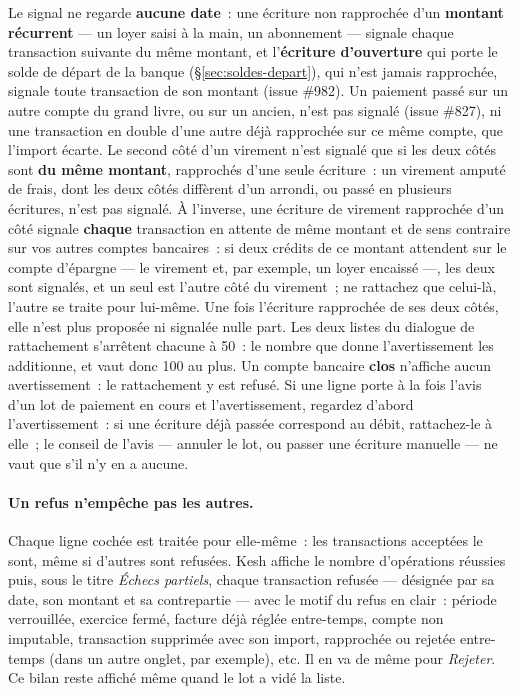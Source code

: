 \documentclass[a4paper,11pt,oneside]{article}
\begin{document}
Le signal ne regarde \textbf{aucune date}~: une écriture non rapprochée d'un \textbf{montant récurrent} --- un loyer saisi à la main, un abonnement --- signale chaque transaction suivante du même montant, et l'\textbf{écriture d'ouverture} qui porte le solde de départ de la banque (\S\ref{sec:soldes-depart}), qui n'est jamais rapprochée, signale toute transaction de son montant (issue \#982). Un paiement passé sur un autre compte du grand livre, ou sur un ancien, n'est pas signalé (issue \#827), ni une transaction en double d'une autre déjà rapprochée sur ce même compte, que l'import écarte. Le second côté d'un virement n'est signalé que si les deux côtés sont \textbf{du même montant}, rapprochés d'une seule écriture~: un virement amputé de frais, dont les deux côtés diffèrent d'un arrondi, ou passé en plusieurs écritures, n'est pas signalé. À l'inverse, une écriture de virement rapprochée d'un côté signale \textbf{chaque} transaction en attente de même montant et de sens contraire sur vos autres comptes bancaires~: si deux crédits de ce montant attendent sur le compte d'épargne --- le virement et, par exemple, un loyer encaissé ---, les deux sont signalés, et un seul est l'autre côté du virement~; ne rattachez que celui-là, l'autre se traite pour lui-même. Une fois l'écriture rapprochée de ses deux côtés, elle n'est plus proposée ni signalée nulle part. Les deux listes du dialogue de rattachement s'arrêtent chacune à 50~: le nombre que donne l'avertissement les additionne, et vaut donc 100 au plus. Un compte bancaire \textbf{clos} n'affiche aucun avertissement~: le rattachement y est refusé. Si une ligne porte à la fois l'avis d'un lot de paiement en cours et l'avertissement, regardez d'abord l'avertissement~: si une écriture déjà passée correspond au débit, rattachez-le à elle~; le conseil de l'avis --- annuler le lot, ou passer une écriture manuelle --- ne vaut que s'il n'y en a aucune.

\paragraph{Un refus n'empêche pas les autres.} Chaque ligne cochée est traitée pour elle-même~: les transactions acceptées le sont, même si d'autres sont refusées. Kesh affiche le nombre d'opérations réussies puis, sous le titre \emph{Échecs partiels}, chaque transaction refusée --- désignée par sa date, son montant et sa contrepartie --- avec le motif du refus en clair~: période verrouillée, exercice fermé, facture déjà réglée entre-temps, compte non imputable, transaction supprimée avec son import, rapprochée ou rejetée entre-temps (dans un autre onglet, par exemple), etc. Il en va de même pour \emph{Rejeter}. Ce bilan reste affiché même quand le lot a vidé la liste.
\end{document}
